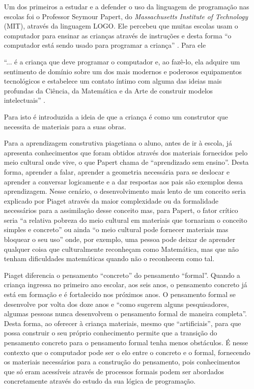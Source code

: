 \documentclass[12pt, openright, a4paper, brazil, english, french, spanish, bibjustif, openany, oneside]{abntex2}
\begin{document}
Um dos primeiros a estudar e a defender o uso da linguagem de programação nas escolas foi o Professor Seymour Papert, do \textit{Massachusetts Institute of Technology} (MIT), através da linguagem LOGO. Ele percebeu que muitas escolas usam o computador para ensinar as crianças através de instruções e desta forma ``o computador está sendo usado para programar a criança'' \cite{papert}. Para ele

\begin{citacao}

``... é a criança que deve programar o computador e, ao fazê-lo, ela adquire um sentimento de domínio sobre um dos mais modernos e poderosos equipamentos tecnológicos e estabelece um contato íntimo com alguma das ideias mais profundas da Ciência, da Matemática e da Arte de construir modelos intelectuais'' \cite{papert}.

\end{citacao}

Para isto é introduzida a ideia de que a criança é como um construtor que necessita de materiais para a suas obras. 

Para  a aprendizagem construtiva piagetiana o aluno, antes de ir à escola, já apresenta conhecimentos que foram obtidos através dos materiais fornecidos pelo meio cultural onde vive, o que Papert chama de ``aprendizado sem ensino''. Desta forma, aprender a falar, aprender a geometria necessária para se deslocar e aprender a conversar logicamente e a dar respostas aos pais são exemplos dessa aprendizagem. Nesse cenário, o desenvolvimento mais lento de um conceito seria explicado por Piaget através da maior complexidade ou da formalidade necessários para a assimilação desse conceito mas, para Papert, o fator crítico seria ``a relativa pobreza do meio cultural em materiais que tornariam o conceito simples e concreto'' ou ainda ``o meio cultural pode fornecer materiais mas bloquear o seu uso'' \cite{papert} onde, por exemplo, uma pessoa pode deixar de aprender qualquer coisa que culturalmente reconheçam como Matemática, mas que não tenham dificuldades matemáticas quando não o reconhecem como tal.

Piaget diferencia o pensamento ``concreto'' do pensamento ``formal''. Quando a criança ingressa no primeiro ano escolar, aos seis anos, o pensamento concreto já está em formação e é fortalecido nos próximos anos. O pensamento formal se desenvolve por volta dos doze anos e ``como sugerem alguns pesquisadores, algumas pessoas nunca desenvolvem o pensamento formal de maneira completa''\cite{papert}. Desta forma, ao oferecer à criança materiais, mesmo que ``artificiais'', para que possa construir o seu próprio conhecimento permite que a transição do pensamento concreto para o pensamento formal tenha menos obstáculos. É nesse contexto que o computador pode ser o elo entre o concreto e o formal, fornecendo os materiais necessários para a construção do pensamento, pois conhecimentos que só eram acessíveis através de processos formais podem ser abordados concretamente através do estudo da sua lógica de programação.
\end{document}

